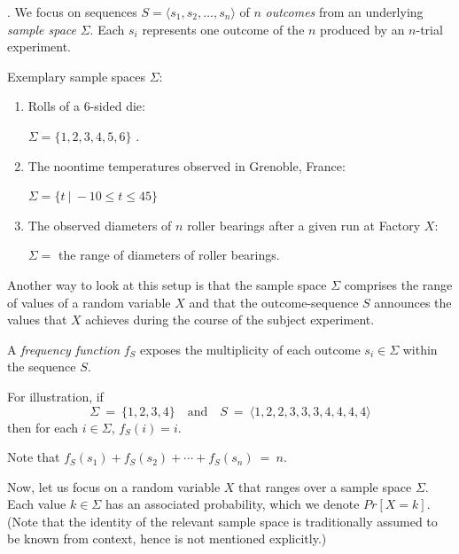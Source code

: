\medskip

.
We focus on sequences $S = \langle s_1, s_2, \ldots, s_n \rangle$ of $n$ {\it outcomes} from an underlying {\it sample space} $\Sigma$.  Each $s_i$ represents one outcome of the $n$ produced by an $n$-trial experiment.

\smallskip

Exemplary sample spaces $\Sigma$:
  \begin{enumerate}
  \item
Rolls of a $6$-sided die:

$\Sigma = \{1, 2, 3, 4, 5, 6\}$ .
  \item
The noontime temperatures observed in Grenoble, France:

$\Sigma = \{ t \ | \ -10 \leq t \leq 45\}$
  \item
The observed diameters of $n$ roller bearings after a given run at Factory $X$:

$\Sigma =$ the range of diameters of roller bearings.
  \end{enumerate}

Another way to look at this setup is that the sample space $\Sigma$ comprises the range of values of a random variable $X$ and that the outcome-sequence $S$ announces the values that $X$ achieves during the course of the subject experiment.

\medskip

A {\it frequency function} $f_S$ exposes the multiplicity of each outcome $s_i \in \Sigma$ within the sequence $S$.

\smallskip

For illustration, if 
\begin{equation}
\label{eq:sample-seq-10}
\Sigma \ = \  \{1, 2, 3, 4\} \ \ \ \mbox{ and } \ \ \
S \ = \ \langle 1, 2, 2, 3, 3, 3, 4, 4, 4, 4 \rangle
\end{equation}
then for each $i \in \Sigma$, $f_S(i) = i$.

\smallskip

Note that $f_S(s_1) + f_S(s_2) + \cdots + f_S(s_n) \ = \ n$.

\medskip


Now, let us focus on a random variable $X$ that ranges over a sample space $\Sigma$.  Each value $k \in \Sigma$ has an associated probability, which we denote $Pr[X=k]$.  (Note that the identity of the relevant sample space is traditionally assumed to be known from context, hence is not mentioned explicitly.)

